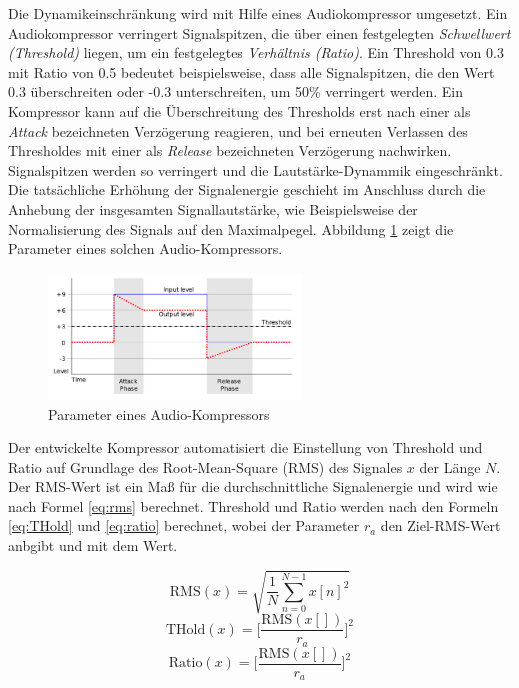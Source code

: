 Die Dynamikeinschränkung wird mit Hilfe eines Audiokompressor umgesetzt. Ein Audiokompressor verringert Signalspitzen, die über einen festgelegten \emph{Schwellwert (Threshold)} liegen, um ein festgelegtes \emph{Verhältnis (Ratio)}. Ein Threshold von 0.3 mit Ratio von 0.5 bedeutet beispielsweise, dass alle Signalspitzen, die den Wert 0.3 überschreiten oder -0.3 unterschreiten, um 50\% verringert werden. Ein Kompressor kann auf die Überschreitung des Thresholds erst nach einer als \emph{Attack} bezeichneten Verzögerung reagieren, und bei erneuten Verlassen des Thresholdes mit einer als \emph{Release} bezeichneten Verzögerung nachwirken. Signalspitzen werden so verringert und die Lautstärke-Dynammik eingeschränkt. Die tatsächliche Erhöhung der Signalenergie geschieht im Anschluss durch die Anhebung der insgesamten Signallautstärke, wie Beispielsweise der Normalisierung des Signals auf den Maximalpegel. Abbildung \ref{img:compressor} zeigt die Parameter eines solchen Audio-Kompressors.

\begin{figure}[h]
	\centering
	\includegraphics[width=0.6\textwidth]{bilder/compressor.png}
	\caption{Parameter eines Audio-Kompressors}
	\label{img:compressor}
\end{figure}

Der entwickelte Kompressor automatisiert die Einstellung von Threshold und Ratio auf Grundlage des Root-Mean-Square (RMS) des Signales $x$ der Länge $N$. Der RMS-Wert ist ein Maß für die durchschnittliche Signalenergie und wird wie nach Formel \ref{eq:rms} berechnet. Threshold und Ratio werden nach den Formeln \ref{eq:THold} und \ref{eq:ratio} berechnet, wobei der Parameter $r_a$ den Ziel-RMS-Wert anbgibt und mit dem Wert.

\begin{equation}
\text{RMS}(x) = \sqrt{\frac{1}{N}\sum_{n=0}^{N-1}x[n]^2}
\label{eq:rms}
\end{equation}
\begin{equation}
\text{THold}(x) = \bigg[\frac{\text{RMS}(x[])}{r_a}\bigg]^{2}
\label{eq:THold}
\end{equation}
\begin{equation}
\text{Ratio}(x) = \bigg[\frac{\text{RMS}(x[])}{r_a}\bigg]^{2}
\label{eq:ratio}
\end{equation}

